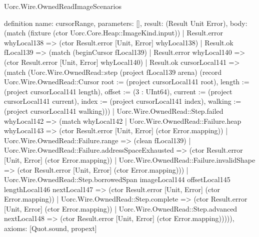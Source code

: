 \begin{lexlean}{Uorc.Wire.OwnedReadImageScenarios}
\begin{semanticmodule}
definition{
  name: cursorRange,
  parameters: [],
  result: (Result Unit Error),
  body: (match (fixture (ctor Uorc.Core.Heap::ImageKind.input))
    | Result.error whyLocal138 => (ctor Result.error [Unit, Error] whyLocal138)
    | Result.ok fLocal139 => (match (beginCursor fLocal139)
      | Result.error whyLocal140 => (ctor Result.error [Unit, Error] whyLocal140)
      | Result.ok cursorLocal141 => (match (Uorc.Wire.OwnedRead::step (project fLocal139 arena) (record Uorc.Wire.OwnedRead::Cursor {root := (project cursorLocal141 root), length := (project cursorLocal141 length), offset := (3 : UInt64), current := (project cursorLocal141 current), index := (project cursorLocal141 index), walking := (project cursorLocal141 walking)}))
        | Uorc.Wire.OwnedRead::Step.failed whyLocal142 => (match whyLocal142
          | Uorc.Wire.OwnedRead::Failure.heap whyLocal143 => (ctor Result.error [Unit, Error] (ctor Error.mapping))
          | Uorc.Wire.OwnedRead::Failure.range => (clean fLocal139)
          | Uorc.Wire.OwnedRead::Failure.addressSpaceExhausted => (ctor Result.error [Unit, Error] (ctor Error.mapping))
          | Uorc.Wire.OwnedRead::Failure.invalidShape => (ctor Result.error [Unit, Error] (ctor Error.mapping)))
        | Uorc.Wire.OwnedRead::Step.borrowedSpan imageLocal144 offsetLocal145 lengthLocal146 nextLocal147 => (ctor Result.error [Unit, Error] (ctor Error.mapping))
        | Uorc.Wire.OwnedRead::Step.complete => (ctor Result.error [Unit, Error] (ctor Error.mapping))
        | Uorc.Wire.OwnedRead::Step.advanced nextLocal148 => (ctor Result.error [Unit, Error] (ctor Error.mapping))))),
  axioms: [Quot.sound, propext]
}


\end{semanticmodule}
\end{lexlean}
